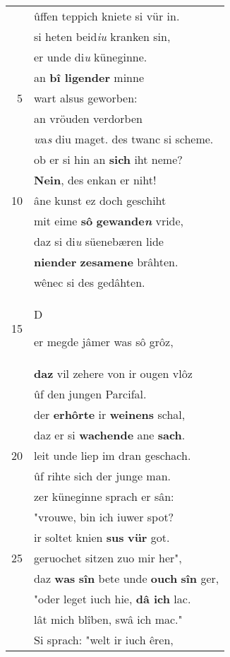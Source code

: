 \documentclass[8pt,a4paper,notitlepage]{article}
\begin{document}
\begin{table}[ht]
\begin{minipage}[t]{0.5\linewidth}
\begin{center}
\end{center}
\begin{tabular}{rl}
 & ûffen teppich kniete si vür in.\\ 
 & si heten beid\textit{iu} kranken sin,\\ 
 & er unde di\textit{u} küneginne.\\ 
 & an \textbf{bî ligender} minne\\ 
5 & wart alsus geworben:\\ 
 & an vröuden verdorben\\ 
 & \textit{w}a\textit{s} diu maget. des twanc si scheme.\\ 
 & ob er si hin an \textbf{sich} iht neme?\\ 
 & \textbf{Nein}, des enkan er niht!\\ 
10 & âne kunst ez doch geschiht\\ 
 & mit eime \textbf{sô} \textbf{gewande\textit{n}} vride,\\ 
 & daz si di\textit{u} süenebæren lide\\ 
 & \textbf{niender} \textbf{zesamene} brâhten.\\ 
 & wênec si des gedâhten.\\ 
15 & \begin{large}D\end{large}er megde jâmer was sô grôz,\\ 
 & \textbf{daz} vil zehere von ir ougen vlôz\\ 
 & ûf den jungen Parcifal.\\ 
 & der \textbf{erhôrte} ir \textbf{weinens} schal,\\ 
 & daz er si \textbf{wachende} ane \textbf{sach}.\\ 
20 & leit unde liep im dran geschach.\\ 
 & ûf rihte sich der junge man.\\ 
 & zer küneginne sprach er sân:\\ 
 & "vrouwe, bin ich iuwer spot?\\ 
 & ir soltet knien \textbf{sus} \textbf{vür} got.\\ 
25 & geruochet sitzen zuo mir her",\\ 
 & daz \textbf{was} \textbf{sîn} bete unde \textbf{ouch} \textbf{sîn} ger,\\ 
 & "oder leget iuch hie, \textbf{dâ ich} lac.\\ 
 & lât mich blîben, swâ ich mac."\\ 
 & Si sprach: "welt ir iuch êren,\\ 

\end{tabular}
\end{minipage}
\end{table}
\end{document}
